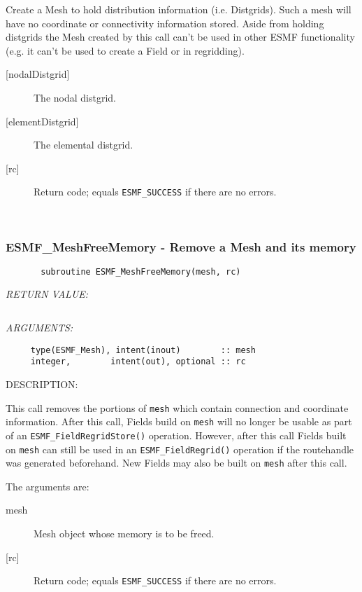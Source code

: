      Create a Mesh to hold distribution information (i.e. Distgrids).
     Such a mesh will have no coordinate or connectivity information stored.
     Aside from holding distgrids the Mesh created by this call can't be used in other
     ESMF functionality (e.g. it can't be used to create a Field or in regridding).
  
     \begin{description}
     \item [{[nodalDistgrid]}]
           The nodal distgrid.
     \item [{[elementDistgrid]}]
           The elemental distgrid.
     \item [{[rc]}]
           Return code; equals {\tt ESMF\_SUCCESS} if there are no errors.
     \end{description}
   
 
\mbox{}\hrulefill\ 
 
\subsubsection [ESMF\_MeshFreeMemory] {ESMF\_MeshFreeMemory - Remove a Mesh and its memory}


  
\begin{verbatim}       subroutine ESMF_MeshFreeMemory(mesh, rc)\end{verbatim}{\em RETURN VALUE:}
\begin{verbatim} \end{verbatim}{\em ARGUMENTS:}
\begin{verbatim}     type(ESMF_Mesh), intent(inout)        :: mesh
     integer,        intent(out), optional :: rc\end{verbatim}
{\sf DESCRIPTION:\\ }


      This call removes the portions of {\tt mesh} which contain connection and coordinate
      information. After this call, Fields build on {\tt mesh} will no longer be usable
      as part of an {\tt ESMF\_FieldRegridStore()} operation. However, after this call
      Fields built on {\tt mesh} can still be used in an {\tt ESMF\_FieldRegrid()}
      operation if the routehandle was generated beforehand. New Fields may also
      be built on {\tt mesh} after this call.
  
   The arguments are:
   \begin{description}
   \item [mesh]
   Mesh object whose memory is to be freed.
   \item [{[rc]}]
           Return code; equals {\tt ESMF\_SUCCESS} if there are no errors.
   \end{description}
   
